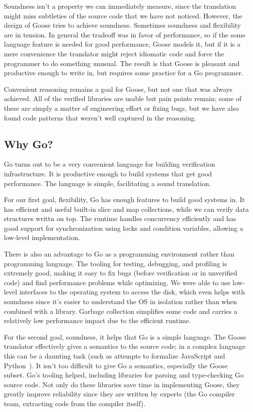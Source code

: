 Soundness isn't a property we can immediately measure, since the translation
might miss subtleties of the source code that we have not noticed. However, the
design of Goose tries to achieve soundness. Sometimes soundness and flexibility
are in tension. In general the tradeoff was in favor of performance, so if the
some language feature is needed for good performance, Goose models it, but if it
is a mere convenience the translator might reject idiomatic code and force the
programmer to do something unusual. The result is that Goose is pleasant and
productive enough to write in, but requires some practice for a Go programmer.

Convenient reasoning remains a goal for Goose, but not one that was always
achieved. All of the verified libraries are usable but pain points remain; some
of these are simply a matter of engineering effort or fixing bugs, but we have
also found code patterns that weren't well captured in the reasoning.

\subsection{Why Go?}

Go turns out to be a very convenient language for building verification
infrastructure. It is productive enough to build systems that get good
performance. The language is simple, facilitating a sound translation.

For our first goal, flexibility, Go has enough features to build good systems
in. It has efficient and useful built-in slice and map collections, while we can
verify data structures writtn on top. The runtime handles concurrency
efficiently and has good support for synchronization using locks and condition
variables, allowing a low-level implementation.

There is also an advantage to Go as a programming environment rather than
programming language. The tooling for testing, debugging, and profiling is
extremely good, making it easy to fix bugs (before verification or in unverified
code) and find performance problems while optimizing. We were able to use
low-level interfaces to the operating system to access the disk, which even
helps with soundness since it's easier to understand the OS in isolation rather
than when combined with a library. Garbage collection simplifies some code and
carries a relatively low performance impact due to the efficient runtime.

For the second goal, soundness, it helps that Go is a simple language. The Goose
translator effectively gives a semantics to the source code; in a complex
language this can be a daunting task (such as attempts to formalize JavaScript and
Python~\cite{guha:lambda-js,politz:python-semantics}). It isn't too
difficult to give Go a semantics, especially the Goose subset. Go's tooling
helped, including libraries for parsing and type-checking Go source code. Not
only do these libraries save time in implementing Goose, they greatly improve
reliability since they are written by experts (the Go compiler team, extracting
code from the compiler itself).

